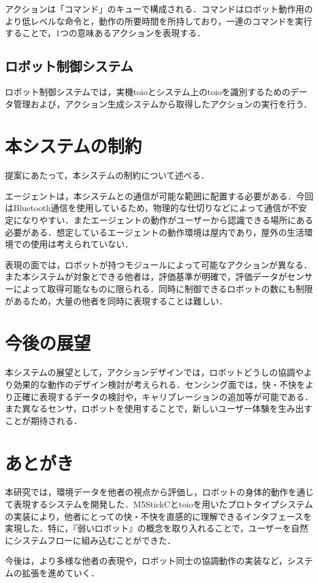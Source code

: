 \documentclass[paper=a4paper,jafontsize=9pt,head_space=15mm,gutter=20mm,
twocolumn,number_of_lines=49, line_length=26zw]{myuarticle}
\begin{document}
アクションは「コマンド」のキューで構成される．コマンドはロボット動作用のより低レベルな命令と，動作の所要時間を所持しており，一連のコマンドを実行することで，1つの意味あるアクションを表現する．

\subsection{ロボット制御システム}
ロボット制御システムでは，実機toioとシステム上のtoioを識別するためのデータ管理および，アクション生成システムから取得したアクションの実行を行う．

\section{本システムの制約}

提案にあたって，本システムの制約について述べる．

エージェントは，本システムとの通信が可能な範囲に配置する必要がある．今回はBluetooth通信を使用しているため，物理的な仕切りなどによって通信が不安定になりやすい．またエージェントの動作がユーザーから認識できる場所にある必要がある．想定しているエージェントの動作環境は屋内であり，屋外の生活環境での使用は考えられていない．

表現の面では，ロボットが持つモジュールによって可能なアクションが異なる．また本システムが対象とできる他者は，評価基準が明確で，評価データがセンサーによって取得可能なものに限られる．同時に制御できるロボットの数にも制限があるため，大量の他者を同時に表現することは難しい．

\section{今後の展望}
本システムの展望として，アクションデザインでは，ロボットどうしの協調やより効果的な動作のデザイン検討が考えられる．センシング面では，快・不快をより正確に表現するデータの検討や，キャリブレーションの追加等が可能である．また異なるセンサ，ロボットを使用することで，新しいユーザー体験を生み出すことが期待される．

\section{あとがき}
本研究では，環境データを他者の視点から評価し，ロボットの身体的動作を通じて表現するシステムを開発した．M5StickCとtoioを用いたプロトタイプシステムの実装により，他者にとっての快・不快を直感的に理解できるインタフェースを実現した．特に，『弱いロボット』の概念を取り入れることで，ユーザーを自然にシステムフローに組み込むことができた．

今後は，より多様な他者の表現や，ロボット同士の協調動作の実装など，システムの拡張を進めていく．

\renewcommand{\refname}{　参考文献}


\end{document}
